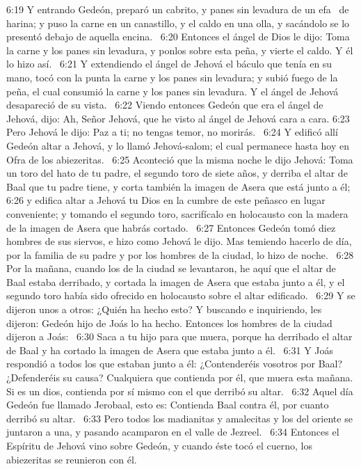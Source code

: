 6:19 Y entrando Gedeón, preparó un cabrito, y panes sin levadura de un efa  de harina; y puso la carne en un canastillo, y el caldo en una olla, y sacándolo se lo presentó debajo de aquella encina.  
6:20 Entonces el ángel de Dios le dijo: Toma la carne y los panes sin levadura, y ponlos sobre esta peña, y vierte el caldo. Y él lo hizo así.  
6:21 Y extendiendo el ángel de Jehová el báculo que tenía en su mano, tocó con la punta la carne y los panes sin levadura; y subió fuego de la peña, el cual consumió la carne y los panes sin levadura. Y el ángel de Jehová desapareció de su vista.  
6:22 Viendo entonces Gedeón que era el ángel de Jehová, dijo: Ah, Señor Jehová, que he visto al ángel de Jehová cara a cara. 
6:23 Pero Jehová le dijo: Paz a ti; no tengas temor, no morirás.  
6:24 Y edificó allí Gedeón altar a Jehová, y lo llamó Jehová-salom; el cual permanece hasta hoy en Ofra de los abiezeritas.  
6:25 Aconteció que la misma noche le dijo Jehová: Toma un toro del hato de tu padre, el segundo toro de siete años, y derriba el altar de Baal que tu padre tiene, y corta también la imagen de Asera que está junto a él;  
6:26 y edifica altar a Jehová tu Dios en la cumbre de este peñasco en lugar conveniente; y tomando el segundo toro, sacrifícalo en holocausto con la madera de la imagen de Asera que habrás cortado.  
6:27 Entonces Gedeón tomó diez hombres de sus siervos, e hizo como Jehová le dijo. Mas temiendo hacerlo de día, por la familia de su padre y por los hombres de la ciudad, lo hizo de noche.  
6:28 Por la mañana, cuando los de la ciudad se levantaron, he aquí que el altar de Baal estaba derribado, y cortada la imagen de Asera que estaba junto a él, y el segundo toro había sido ofrecido en holocausto sobre el altar edificado.  
6:29 Y se dijeron unos a otros: ¿Quién ha hecho esto? Y buscando e inquiriendo, les dijeron: Gedeón hijo de Joás lo ha hecho. Entonces los hombres de la ciudad dijeron a Joás:  
6:30 Saca a tu hijo para que muera, porque ha derribado el altar de Baal y ha cortado la imagen de Asera que estaba junto a él.  
6:31 Y Joás respondió a todos los que estaban junto a él: ¿Contenderéis vosotros por Baal? ¿Defenderéis su causa? Cualquiera que contienda por él, que muera esta mañana. Si es un dios, contienda por sí mismo con el que derribó su altar.  
6:32 Aquel día Gedeón fue llamado Jerobaal, esto es: Contienda Baal contra él, por cuanto derribó su altar.  
6:33 Pero todos los madianitas y amalecitas y los del oriente se juntaron a una, y pasando acamparon en el valle de Jezreel.  
6:34 Entonces el Espíritu de Jehová vino sobre Gedeón, y cuando éste tocó el cuerno, los abiezeritas se reunieron con él.  
